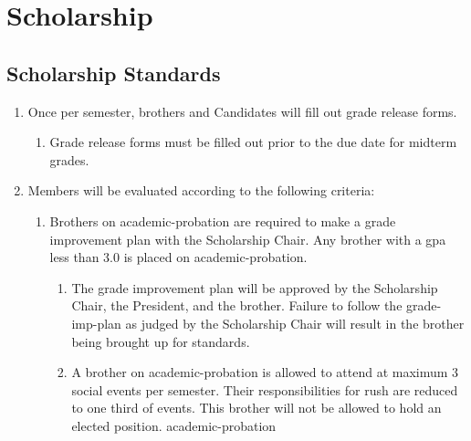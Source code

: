 \chapter{Scholarship}


\section{Scholarship Standards}
	\label{member-schol-stds}
	\begin{enumerate}
		\item Once per semester, brothers and Candidates will fill out grade release forms.
		\begin{enumerate}
			\item Grade release forms must be filled out prior to the due date for midterm grades.
		\end{enumerate}

		\item Members will be evaluated according to the following criteria:\label{academic-probation}
		\begin{enumerate}
			\item Brothers on \gls{academic-probation} are required to make a  grade improvement plan with the Scholarship Chair. Any brother with a  \gls{gpa} less than 3.0 is placed on \gls{academic-probation}.

			\begin{enumerate}
				\item The grade improvement plan will be approved by the Scholarship Chair, the President, and the brother. Failure to follow the \gls{grade-imp-plan} as judged by the Scholarship Chair will result in the brother being brought up for standards.
				\label{academic-watch}

				\item A brother on \gls{academic-probation} is allowed to attend at maximum 3 social events per semester. Their responsibilities for \gls{rush} are reduced to one third of events. This brother will not be allowed to hold an elected position. \label{officer-eligibility}
				\gls{academic-probation}
			\end{enumerate}


\end{enumerate}
\end{enumerate}
